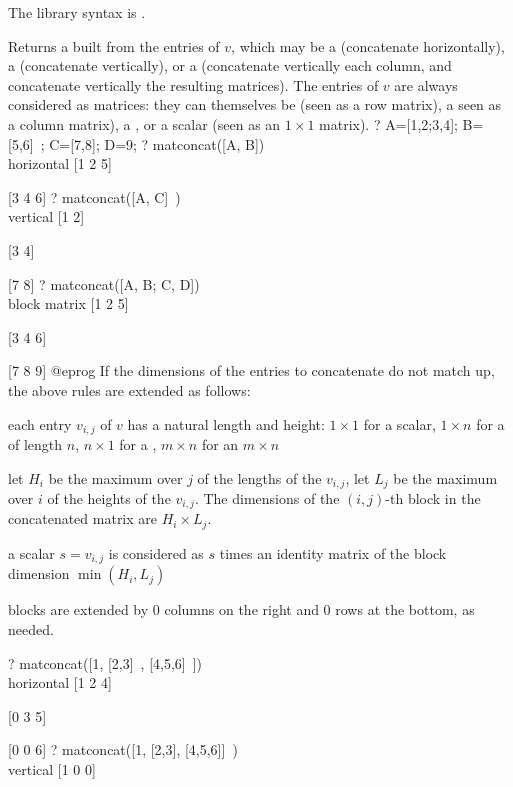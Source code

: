The library syntax is .

\label{se:matconcat}
Returns a  built from the entries of $v$, which may
be a  (concatenate horizontally), a  (concatenate
vertically), or a  (concatenate vertically each column, and
concatenate vertically the resulting matrices). The entries of $v$ are always
considered as matrices: they can themselves be  (seen as a row
matrix), a  seen as a column matrix), a , or a scalar (seen
as an $1 \times 1$ matrix).
\bprog
? A=[1,2;3,4]; B=[5,6]~; C=[7,8]; D=9;
? matconcat([A, B]) \\ horizontal
[1 2 5]

[3 4 6]
? matconcat([A, C]~) \\ vertical
[1 2]

[3 4]

[7 8]
? matconcat([A, B; C, D]) \\ block matrix
[1 2 5]

[3 4 6]

[7 8 9]
@eprog\noindent
If the dimensions of the entries to concatenate do not match up, the above
rules are extended as follows:

\item each entry $v_{i,j}$ of $v$ has a natural length and height: $1 \times
1$ for a scalar, $1 \times n$ for a  of length $n$, $n \times 1$
for a , $m \times n$ for an $m\times n$ 

\item let $H_i$ be the maximum over $j$ of the lengths of the $v_{i,j}$,
let $L_j$ be the maximum over $i$ of the heights of the $v_{i,j}$.
The dimensions of the $(i,j)$-th block in the concatenated matrix are
$H_i \times L_j$.

\item a scalar $s = v_{i,j}$ is considered as $s$ times an identity matrix
of the block dimension $\min (H_i,L_j)$

\item blocks are extended by 0 columns on the right and 0 rows at the
bottom, as needed.

\bprog
? matconcat([1, [2,3]~, [4,5,6]~]) \\ horizontal
[1 2 4]

[0 3 5]

[0 0 6]
? matconcat([1, [2,3], [4,5,6]]~) \\ vertical
[1 0 0]

